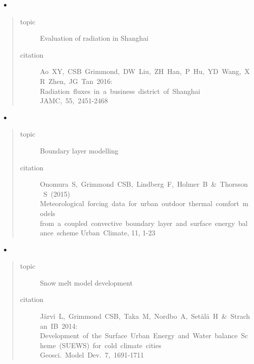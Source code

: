 \documentclass[letterpaper,10pt,english]{sphinxmanual}
\begin{document}
\begin{itemize}
\item {} 

\end{itemize}
\begin{quote}\begin{description}
\item[{topic}] \leavevmode
Evaluation of radiation in Shanghai

\item[{citation}] \leavevmode
Ao XY, CSB Grimmond, DW Liu, ZH Han, P Hu, YD Wang, XR Zhen, JG Tan 2016:
Radiation fluxes in a business district of Shanghai
JAMC, 55, 2451-2468

\end{description}\end{quote}
\begin{itemize}
\item {} 

\end{itemize}
\begin{quote}\begin{description}
\item[{topic}] \leavevmode
Boundary layer modelling

\item[{citation}] \leavevmode
Onomura S, Grimmond CSB, Lindberg F, Holmer B \& Thorsson S (2015)
Meteorological forcing data for urban outdoor thermal comfort models
from a coupled convective boundary layer and surface energy balance scheme
Urban Climate, 11, 1-23

\end{description}\end{quote}
\begin{itemize}
\item {} 

\end{itemize}
\begin{quote}\begin{description}
\item[{topic}] \leavevmode
Snow melt model development

\item[{citation}] \leavevmode
Järvi L, Grimmond CSB, Taka M, Nordbo A, Setälä H \& Strachan IB 2014:
Development of the Surface Urban Energy and Water balance Scheme (SUEWS) for cold climate cities
Geosci. Model Dev. 7, 1691-1711

\end{description}\end{quote}
\end{document}

